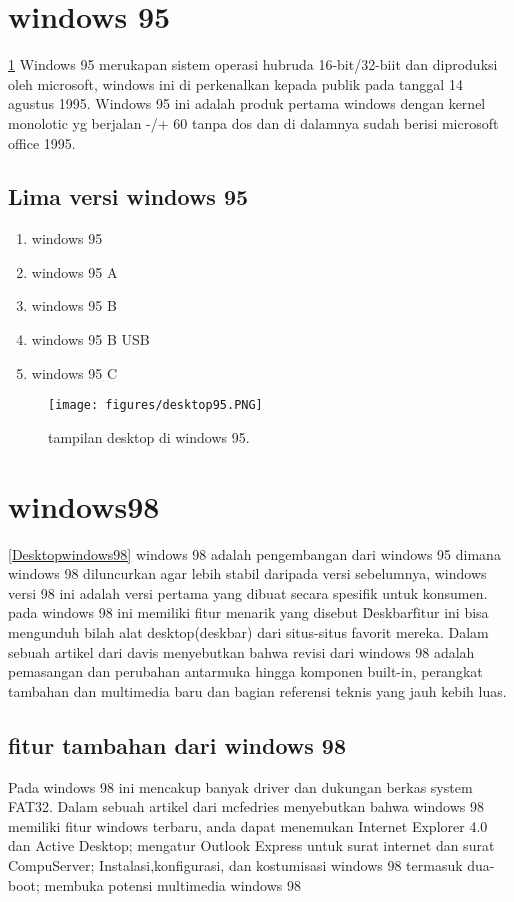 \section{windows 95}
\ref{desktop95}
	Windows 95 merukapan sistem operasi hubruda 16-bit/32-biit dan 
	diproduksi oleh microsoft, windows ini di perkenalkan kepada 
	publik pada tanggal 14 agustus 1995. Windows 95 ini adalah produk 
	pertama windows dengan kernel monolotic yg berjalan  -/+  60 tanpa dos 
	dan di dalamnya sudah berisi microsoft office 1995. \cite{petzold1996programming} 
	\subsection{Lima versi windows 95}
\begin{enumerate}
		\item windows 95
		\item windows 95 A
		\item windows 95 B
		\item windows 95 B USB
		\item windows 95 C
\end{enumerate}

\begin{figure}[ht]
\centerline{\texttt{[image: figures/desktop95.PNG]}}
\caption{tampilan desktop di windows 95.}
\label{desktop95}
\end{figure}

\section{windows98}
		\ref{Desktopwindows98}
	windows 98 adalah pengembangan dari windows 95 dimana windows 98 diluncurkan agar lebih stabil daripada versi sebelumnya, windows versi 98 ini adalah versi pertama yang dibuat secara spesifik untuk konsumen. pada windows 98 ini memiliki fitur menarik yang disebut \"Deskbar\" fitur ini bisa mengunduh bilah alat desktop(deskbar) dari situs-situs favorit mereka.
	Dalam sebuah artikel dari davis menyebutkan bahwa revisi dari windows 98 adalah pemasangan dan perubahan antarmuka hingga komponen built-in, perangkat tambahan dan multimedia baru dan bagian referensi teknis yang jauh kebih luas. \cite{Davis:1998:W9B:551711}
	\subsection{fitur tambahan dari windows 98}
			Pada windows 98 ini mencakup banyak driver dan dukungan berkas system FAT32.
		Dalam sebuah artikel dari mcfedries menyebutkan bahwa windows 98 memiliki fitur windows terbaru, anda dapat menemukan Internet Explorer 4.0 dan Active Desktop; mengatur Outlook Express untuk surat internet dan surat CompuServer; Instalasi,konfigurasi, dan kostumisasi windows 98 termasuk dua-boot; membuka potensi multimedia windows 98 \cite{mcfedries1998windows}

